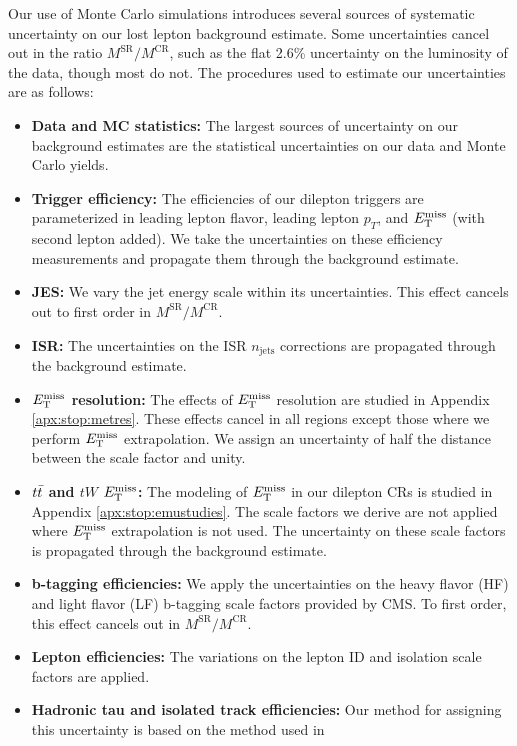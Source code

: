 Our use of Monte Carlo simulations introduces several sources of
systematic uncertainty on our lost lepton background
estimate. Some uncertainties cancel out in the
ratio $M^\text{SR} / M^\text{CR}$, such as the flat 2.6\% uncertainty
on the luminosity of the data, though most do not. The procedures used to
estimate our uncertainties are as follows:

\begin{itemize}
\item \textbf{Data and MC statistics:} The largest sources of uncertainty
  on our background estimates are the statistical uncertainties on our
  data and Monte Carlo yields.
\item \textbf{Trigger efficiency:} The efficiencies of our dilepton
  triggers are parameterized in leading lepton flavor, leading lepton
  $p_T$, and $E_\text{T}^\text{miss}$ (with second lepton added). We take the
  uncertainties on these efficiency measurements and propagate them
  through the background estimate.
\item \textbf{JES:} We vary the jet energy scale within its
  uncertainties. This effect cancels out to first order in
  $M^\text{SR} / M^\text{CR}$.
\item \textbf{ISR:} The uncertainties on the ISR $n_\text{jets}$ corrections are
  propagated through the background estimate.
\item \textbf{$E_\text{T}^\text{miss}$ resolution:} The effects of $E_\text{T}^\text{miss}$ resolution are
  studied in Appendix \ref{apx:stop:metres}. These effects cancel in all regions
  except those where we perform $E_\text{T}^\text{miss}$ extrapolation. We assign an
  uncertainty of half the distance between the scale factor and
  unity.
\item \textbf{$t\bar{t}$ and $tW$ $E_\text{T}^\text{miss}$:} The modeling of $E_\text{T}^\text{miss}$ in our
  dilepton CRs is studied in Appendix \ref{apx:stop:emustudies}. The
  scale factors we derive are not applied where $E_\text{T}^\text{miss}$ extrapolation
  is not used. The uncertainty on these scale factors is propagated
  through the background estimate.
\item \textbf{b-tagging efficiencies:} We apply the uncertainties on the heavy
  flavor (HF) and light flavor (LF) b-tagging scale factors provided
  by CMS. To first order, this effect cancels out in $M^\text{SR} /
  M^\text{CR}$.
\item \textbf{Lepton efficiencies:} The variations on the lepton ID
  and isolation scale factors are applied.
\item \textbf{Hadronic tau and isolated track efficiencies:} Our
  method for assigning this uncertainty is based on the method used in

\end{itemize}
